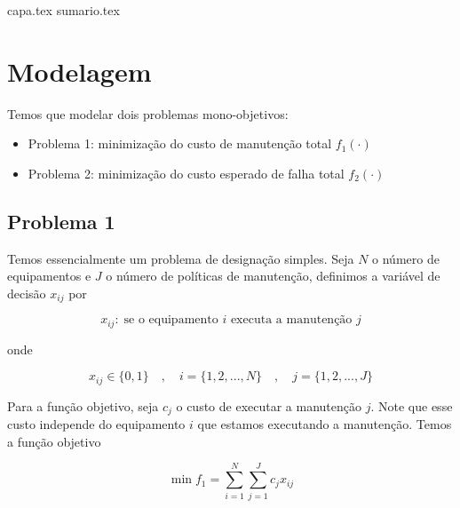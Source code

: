 \documentclass[
	12pt,				%
	oneside,			%
	a4paper,			%
	chapter=TITLE,
	sumario=tradicional,
	english,			%
	brazil				%
]{abntex2}
\newcommand{\un}[1]{\;\text{#1}}
\begin{document}

\frenchspacing 

{capa.tex}
{sumario.tex}

\textual

\pagestyle{simple}

\chapter{Modelagem}\label{cap:modelagem} 

Temos que modelar dois problemas mono-objetivos:

\begin{itemize}
	\item Problema 1: minimização do custo de manutenção total $f_1 (\cdot)$
	\item Problema 2: minimização do custo esperado de falha total $f_2 (\cdot)$
\end{itemize}

\section{Problema 1}

Temos essencialmente um problema de designação simples. Seja $N$ o número de 
equipamentos e $J$ o número de políticas de manutenção, definimos a variável de decisão $x_{ij}$ 
por

\begin{equation}
	x_{ij}: \un{se o equipamento $i$ executa a manutenção $j$}
\end{equation}

\noindent onde 

\[ x_{ij} \in \{0,1\} \quad , \quad i = \{1, 2, ..., N\}  \quad , \quad j = \{1, 2, ..., J\} \]

Para a função objetivo, seja $c_j$ o custo de executar a manutenção $j$. Note que esse custo 
independe do equipamento $i$ que estamos executando a manutenção. Temos a função objetivo  

\begin{equation}\label{eq:objf1}
	\min f_1 = \sum_{i=1}^{N} \sum_{j=1}^{J} c_j x_{ij}
\end{equation}
\end{document}
